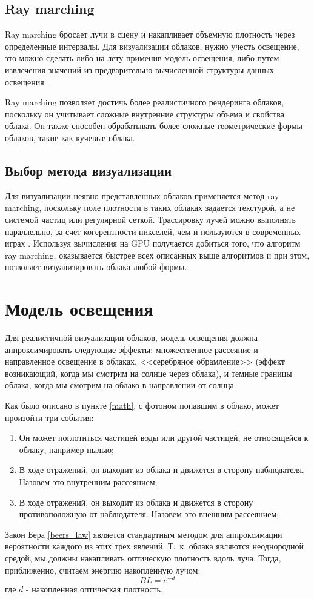 \subsection{Ray marching}
\label{ray}
Ray marching бросает лучи в сцену и накапливает объемную плотность через определенные интервалы. Для визуализации облаков, нужно учесть освещение, это можно сделать либо на лету применив модель освещения, либо путем извлечения значений из предварительно вычисленной структуры данных освещения \cite{hzd, frostbite, clouds}.

Ray marching позволяет достичь более реалистичного рендеринга облаков, поскольку он учитывает сложные внутренние структуры объема и свойства облака. Он также способен обрабатывать более сложные геометрические формы облаков, такие как кучевые облака.

\subsection{Выбор метода визуализации}
Для визуализации неявно представленных облаков применяется метод ray marching, поскольку поле плотности в таких облаках задается текстурой, а не системой частиц или регулярной сеткой. Трассировку лучей можно выполнять параллельно, за счет когерентности пикселей, чем и пользуются в современных играх \cite{hzd, frostbite}. Используя вычисления на GPU получается добиться того, что алгоритм ray marching, оказывается быстрее всех описанных выше алгоритмов и при этом, позволяет визуализировать облака любой формы.


\section{Модель освещения}

Для реалистичной визуализации облаков, модель освещения должна аппроксимировать следующие эффекты: множественное рассеяние и направленное освещение в облаках, <<серебряное обрамление>> (эффект возникающий, когда мы смотрим на солнце через облака), и темные границы облака, когда мы смотрим на облако в направлении от солнца. 

Как было описано в пункте \ref{math}, с фотоном попавшим в облако, может произойти три события:
\begin{enumerate}
	\item Он может поглотиться частицей воды или другой частицей, не относящейся к облаку, например пылью;
	\item В ходе отражений, он выходит из облака и движется в сторону наблюдателя. Назовем это внутренним рассеянием;
	\item В ходе отражений, он выходит из облака и движется в сторону противоположную от наблюдателя. Назовем это внешним рассеянием;
\end{enumerate}
Закон Бера \eqref{beers_law} является стандартным методом для аппроксимации вероятности каждого из этих трех явлений. Т.~к. облака являются неоднородной средой, мы должны накапливать оптическую плотность вдоль луча. Тогда, приближенно, считаем энергию накопленную лучом:
\begin{equation}
	\label{bl}
	BL = e ^ {-d}
\end{equation}
где $ d $ - накопленная оптическая плотность.



